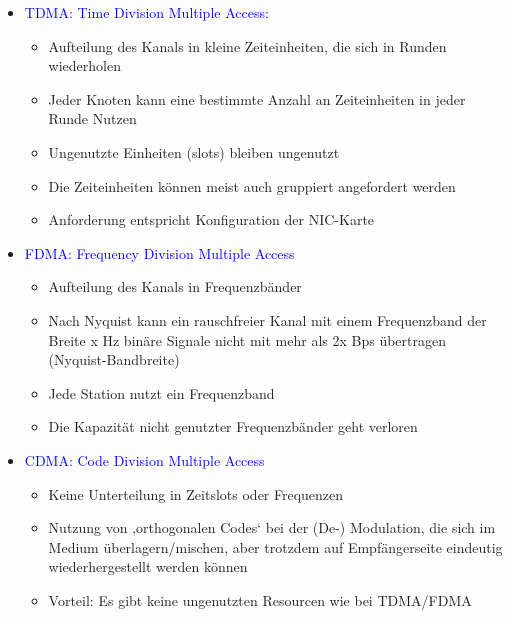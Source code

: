 \begin{itemize}
    \item \textcolor{blue}{TDMA: Time Division Multiple Access:}
    \begin{itemize}
        \item Aufteilung des Kanals in kleine Zeiteinheiten, die sich in Runden wiederholen
        \item Jeder Knoten kann eine bestimmte Anzahl an Zeiteinheiten in jeder Runde Nutzen
        \item Ungenutzte Einheiten (slots) bleiben ungenutzt
        \item Die Zeiteinheiten können meist auch gruppiert angefordert werden
        \item Anforderung entspricht Konfiguration der NIC-Karte
    \end{itemize}
    \item \textcolor{blue}{FDMA: Frequency Division Multiple Access}
    \begin{itemize}
        \item Aufteilung des Kanals in Frequenzbänder
        \item Nach Nyquist kann ein rauschfreier Kanal mit einem Frequenzband der Breite x Hz binäre Signale nicht mit mehr als 2x Bps übertragen (Nyquist-Bandbreite)
        \item Jede Station nutzt ein Frequenzband
        \item Die Kapazität nicht genutzter Frequenzbänder geht verloren
    \end{itemize}
    \item \textcolor{blue}{CDMA: Code Division Multiple Access}
    \begin{itemize}
        \item Keine Unterteilung in Zeitslots oder Frequenzen
        \item Nutzung von ‚orthogonalen Codes‘ bei der (De-) Modulation, die sich im Medium überlagern/mischen, aber trotzdem auf Empfängerseite eindeutig wiederhergestellt werden können
        \item Vorteil: Es gibt keine ungenutzten Resourcen wie bei TDMA/FDMA
    \end{itemize}
\end{itemize}

